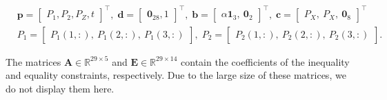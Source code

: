 \documentclass[11pt,letterpaper]{article}
\begin{document}
\begin{align*}
    & \mathbf{p} = \begin{bmatrix}P_1, P_2, P_{Z}, t\end{bmatrix}^\intercal, \; 
    \mathbf{d} = \begin{bmatrix}\mathbf{0}_{28}, 1\end{bmatrix}^\intercal, \; 
    \mathbf{b} = \begin{bmatrix}
        \alpha \mathbf{1}_3 , ~ \mathbf{0}_2
    \end{bmatrix}^\intercal, \; 
    \mathbf{c} = \begin{bmatrix}
        P_X, ~  P_X, ~\mathbf{0}_8
    \end{bmatrix} ^\intercal \\
    & P_1= \begin{bmatrix}P_1(1,:), ~P_1(2,:), ~P_1(3,:)\end{bmatrix}, \; 
    P_2 = \begin{bmatrix}P_2(1,:), ~P_2(2,:), ~P_2(3,:)\end{bmatrix}.
\end{align*}

 The matrices $\mathbf{A} \in \mathbb{R}^{29 \times 5}$ and $\mathbf{E}\in \mathbb{R}^{29 \times 14}$ contain the coefficients of the inequality and equality constraints, respectively. Due to the large size of these matrices, we do not display them here.
\end{document}
